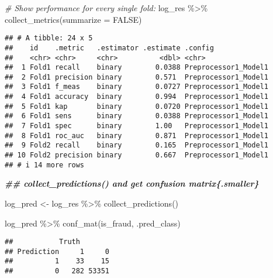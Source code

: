 \documentclass[
]{article}
\newenvironment{Shaded}{\begin{snugshade}}{\end{snugshade}}
\newcommand{\AttributeTok}[1]{\textcolor[rgb]{0.77,0.63,0.00}{#1}}
\newcommand{\CommentTok}[1]{\textcolor[rgb]{0.56,0.35,0.01}{\textit{#1}}}
\newcommand{\ConstantTok}[1]{\textcolor[rgb]{0.00,0.00,0.00}{#1}}
\newcommand{\DocumentationTok}[1]{\textcolor[rgb]{0.56,0.35,0.01}{\textbf{\textit{#1}}}}
\newcommand{\FunctionTok}[1]{\textcolor[rgb]{0.00,0.00,0.00}{#1}}
\newcommand{\NormalTok}[1]{#1}
\newcommand{\OtherTok}[1]{\textcolor[rgb]{0.56,0.35,0.01}{#1}}
\newcommand{\SpecialCharTok}[1]{\textcolor[rgb]{0.00,0.00,0.00}{#1}}
\begin{document}
\begin{Shaded}
\begin{Highlighting}[]
\CommentTok{\# Show performance for every single fold:}
\NormalTok{log\_res }\SpecialCharTok{\%\textgreater{}\%}  \FunctionTok{collect\_metrics}\NormalTok{(}\AttributeTok{summarize =} \ConstantTok{FALSE}\NormalTok{)}
\end{Highlighting}
\end{Shaded}

\begin{verbatim}
## # A tibble: 24 x 5
##    id    .metric   .estimator .estimate .config             
##    <chr> <chr>     <chr>          <dbl> <chr>               
##  1 Fold1 recall    binary        0.0388 Preprocessor1_Model1
##  2 Fold1 precision binary        0.571  Preprocessor1_Model1
##  3 Fold1 f_meas    binary        0.0727 Preprocessor1_Model1
##  4 Fold1 accuracy  binary        0.994  Preprocessor1_Model1
##  5 Fold1 kap       binary        0.0720 Preprocessor1_Model1
##  6 Fold1 sens      binary        0.0388 Preprocessor1_Model1
##  7 Fold1 spec      binary        1.00   Preprocessor1_Model1
##  8 Fold1 roc_auc   binary        0.871  Preprocessor1_Model1
##  9 Fold2 recall    binary        0.165  Preprocessor1_Model1
## 10 Fold2 precision binary        0.667  Preprocessor1_Model1
## # i 14 more rows
\end{verbatim}

\begin{Shaded}
\begin{Highlighting}[]
\DocumentationTok{\#\# \textasciigrave{}collect\_predictions()\textasciigrave{} and get confusion matrix\{.smaller\}}

\NormalTok{log\_pred }\OtherTok{\textless{}{-}}\NormalTok{ log\_res }\SpecialCharTok{\%\textgreater{}\%} \FunctionTok{collect\_predictions}\NormalTok{()}

\NormalTok{log\_pred }\SpecialCharTok{\%\textgreater{}\%}  \FunctionTok{conf\_mat}\NormalTok{(is\_fraud, .pred\_class) }
\end{Highlighting}
\end{Shaded}

\begin{verbatim}
##           Truth
## Prediction     1     0
##          1    33    15
##          0   282 53351
\end{verbatim}
\end{document}
